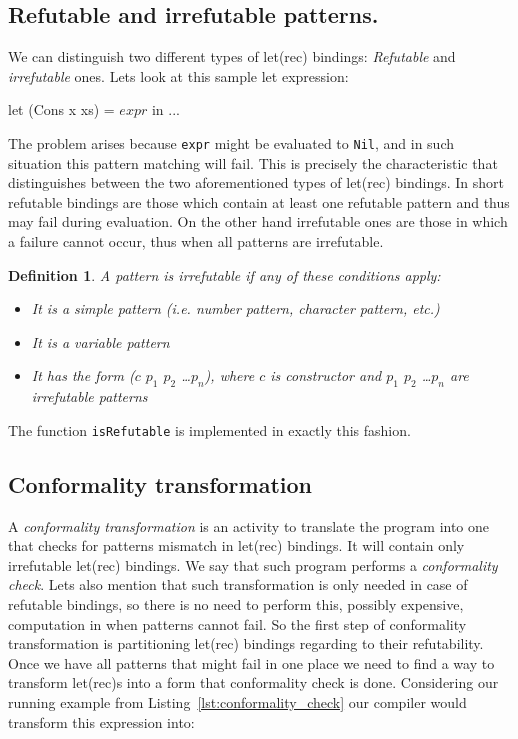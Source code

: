 \documentclass[12pt,a4paper]{report}
\newtheorem{definition}{Definition}[chapter]
\begin{document}
\subsection{Refutable and irrefutable patterns.}
\label{sec:irrefutable_patterns}
We can distinguish two different types of let(rec) bindings: \textit{Refutable}
and \textit{irrefutable} ones. Lets look at this sample let expression:

\vspace*{0.2in}
\begin{code}[style=haskell,mathescape=true,label=lst:conformality_check,caption={Pattern matching let binding.}]
let (Cons x xs) = $expr$ in ...
\end{code}

The problem arises because \texttt{expr} might be evaluated to \texttt{Nil},
and in such situation this pattern matching will fail. This is precisely the
characteristic that distinguishes between the two aforementioned types of
let(rec) bindings. In short refutable bindings are those which contain
at least one refutable pattern and thus may fail during evaluation. On the
other hand irrefutable ones are those in which a failure cannot occur, thus
when all patterns are irrefutable.

\begin{definition}
  \label{def:irrefutable_pattern}
  A pattern is irrefutable if any of these conditions apply:
  \begin{itemize}
    \item It is a simple pattern (i.e. number pattern, character pattern, etc.)
    \item It is a variable pattern
    \item It has the form ($c$ $p_{1}$ $p_{2}$ \ldots $p_{n}$), where $c$ is
      constructor and $p_{1}$ $p_{2}$ \ldots $p_{n}$ are irrefutable patterns
  \end{itemize}
\end{definition}
The function \texttt{isRefutable} is implemented in exactly this fashion.

\subsection{Conformality transformation}
\label{sec:conformality_transformation}
A \textit{conformality transformation} is an activity to translate the program
into one that checks for patterns mismatch in let(rec) bindings. It
will contain only irrefutable let(rec) bindings. We say that such
program performs a \textit{conformality check}. Lets also mention that such
transformation is only needed in case of refutable bindings, so there is no need
to perform this, possibly expensive, computation in when patterns cannot fail.
So the first step of conformality transformation is partitioning
let(rec) bindings regarding to their refutability. Once we have all
patterns that might fail in one place we need to find a way to transform
let(rec)s into a form that conformality check is done.  Considering
our running example from Listing~\ref{lst:conformality_check} our compiler
would transform this expression into:
\end{document}
